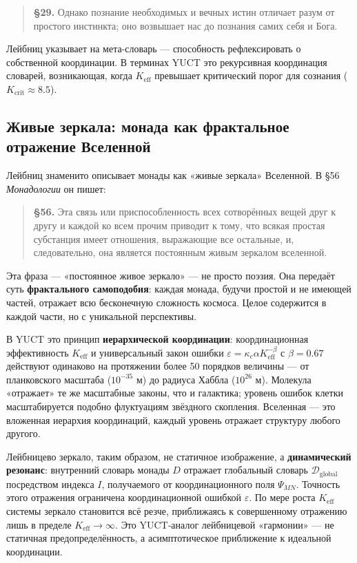 \documentclass[12pt,a4paper]{article}
\begin{document}
	\begin{quote}
		\textbf{§29.} Однако познание необходимых и вечных истин отличает разум от простого инстинкта; оно возвышает нас до познания самих себя и Бога.
	\end{quote}
	
	Лейбниц указывает на мета-словарь — способность рефлексировать о собственной координации. В терминах YUCT это рекурсивная координация словарей, возникающая, когда \(K_{\mathrm{eff}}\) превышает критический порог для сознания (\(K_{\mathrm{crit}} \approx 8.5\)).
	
	\subsection{Живые зеркала: монада как фрактальное отражение Вселенной}
	
	Лейбниц знаменито описывает монады как «живые зеркала» Вселенной. В §56 \emph{Монадологии} он пишет:
	
	\begin{quote}
		\textbf{§56.} Эта связь или приспособленность всех сотворённых вещей друг к другу и каждой ко всем прочим приводит к тому, что всякая простая субстанция имеет отношения, выражающие все остальные, и, следовательно, она является постоянным живым зеркалом вселенной.
	\end{quote}
	
	Эта фраза — «постоянное живое зеркало» — не просто поэзия. Она передаёт суть \textbf{фрактального самоподобия}: каждая монада, будучи простой и не имеющей частей, отражает всю бесконечную сложность космоса. Целое содержится в каждой части, но с уникальной перспективы.
	
	В YUCT это принцип \textbf{иерархической координации}: координационная эффективность \(K_{\mathrm{eff}}\) и универсальный закон ошибки \(\varepsilon = \kappa_c \alpha K_{\mathrm{eff}}^{-\beta}\) с \(\beta=0.67\) действуют одинаково на протяжении более 50 порядков величины — от планковского масштаба (\(10^{-35}\) м) до радиуса Хаббла (\(10^{26}\) м). Молекула «отражает» те же масштабные законы, что и галактика; уровень ошибок клетки масштабируется подобно флуктуациям звёздного скопления. Вселенная — это вложенная иерархия координаций, каждый уровень отражает структуру любого другого.
	
	Лейбницево зеркало, таким образом, не статичное изображение, а \textbf{динамический резонанс}: внутренний словарь монады \(D\) отражает глобальный словарь \(\mathcal{D}_{\text{global}}\) посредством индекса \(I\), получаемого от координационного поля \(\Psi_{MN}\). Точность этого отражения ограничена координационной ошибкой \(\varepsilon\). По мере роста \(K_{\mathrm{eff}}\) системы зеркало становится всё резче, приближаясь к совершенному отражению лишь в пределе \(K_{\mathrm{eff}} \to \infty\). Это YUCT‑аналог лейбницевой «гармонии» — не статичная предопределённость, а асимптотическое приближение к идеальной координации.
	
\end{document}
